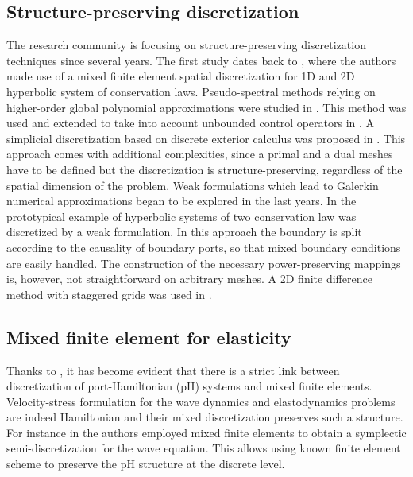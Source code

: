 \subsection{Structure-preserving discretization}

The research community is focusing on structure-preserving discretization techniques since several years. The first study dates back to \cite{golo2004hamiltonian}, where the authors made use of a mixed finite element spatial discretization for 1D and 2D hyperbolic system of conservation laws. Pseudo-spectral methods relying on higher-order global polynomial approximations were studied in \cite{moulla2012pseudo}. This method was used and extended to take into account unbounded control operators in \cite{cardoso2017}. A simplicial discretization based on discrete exterior calculus was proposed in \cite{seslija2012discrete}. This approach comes with additional complexities, since a primal and a dual meshes have to be defined but the discretization is structure-preserving, regardless of the spatial dimension of the problem. Weak formulations which lead to Galerkin numerical approximations began to be explored in the last years. In \cite{kotyczka2018weak} the prototypical example of hyperbolic systems of two conservation law was discretized by a weak formulation. In this approach the boundary is split according to the causality of boundary ports, so that mixed boundary conditions are easily handled. The construction of the necessary power-preserving mappings is, however, not straightforward on arbitrary meshes. A 2D finite difference method with staggered grids was used in \cite{trenchant2018}.

\subsection{Mixed finite element for elasticity}

Thanks to \cite{cardoso2018pfem}, it has become evident that there is a strict link between  discretization of port-Hamiltonian (pH) systems and mixed finite elements. Velocity-stress formulation for the wave dynamics and elastodynamics problems are indeed Hamiltonian and their mixed discretization preserves such a structure. For instance in \cite{kirby2015} the authors employed mixed finite elements to obtain a  symplectic semi-discretization for the wave equation. This allows using known finite element scheme to preserve the pH structure at the discrete level. \\

